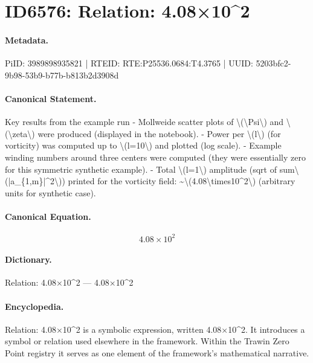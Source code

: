 \section*{ID6576: Relation: 4.08×10\textasciicircum{}2}
\paragraph{Metadata.}
PiID: 3989898935821 | RTEID: RTE:P25536.0684:T4.3765 | UUID: 5203bfc2-9b98-53b9-b77b-b813b2d3908d

\paragraph{Canonical Statement.}
Key results from the example run - Mollweide scatter plots of \textbackslash{}(\textbackslash{}Psi\textbackslash{}) and \textbackslash{}(\textbackslash{}zeta\textbackslash{}) were produced (displayed in the notebook). - Power per \textbackslash{}(l\textbackslash{}) (for vorticity) was computed up to \textbackslash{}(l=10\textbackslash{}) and plotted (log scale). - Example winding numbers around three centers were computed (they were essentially zero for this symmetric synthetic example). - Total \textbackslash{}(l=1\textbackslash{}) amplitude (sqrt of sum\textbackslash{}(|a\_\{1,m\}|\textasciicircum{}2\textbackslash{})) printed for the vorticity field: \textasciitilde{}\textbackslash{}(4.08\textbackslash{}times10\textasciicircum{}2\textbackslash{}) (arbitrary units for synthetic case).

\paragraph{Canonical Equation.}
\[
4.08\times10^2
\]

\paragraph{Dictionary.}
Relation: 4.08×10\textasciicircum{}2 — 4.08×10\textasciicircum{}2

\paragraph{Encyclopedia.}
Relation: 4.08×10\textasciicircum{}2 is a symbolic expression, written 4.08×10\textasciicircum{}2. It introduces a symbol or relation used elsewhere in the framework. Within the Trawin Zero Point registry it serves as one element of the framework's mathematical narrative.
